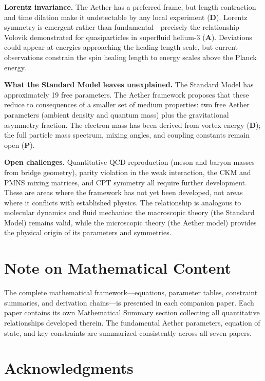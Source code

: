 \documentclass[12pt,letterpaper]{article}
\begin{document}
\textbf{Lorentz invariance.}
The Aether has a preferred frame, but length contraction and time dilation make it
undetectable by any local experiment (\textbf{D}).  Lorentz symmetry is emergent
rather than fundamental---precisely the relationship Volovik demonstrated for
quasiparticles in superfluid helium-3 (\textbf{A}).  Deviations could appear at
energies approaching the healing length scale, but current observations
constrain the spin healing length to energy scales above the Planck energy.

\textbf{What the Standard Model leaves unexplained.}
The Standard Model has approximately 19 free parameters.  The Aether framework
proposes that these reduce to consequences of a smaller set of medium properties:
two free Aether parameters (ambient density and quantum mass) plus the
gravitational asymmetry fraction.  The electron mass has been derived from
vortex energy (\textbf{D}); the full particle mass spectrum, mixing angles,
and coupling constants remain open (\textbf{P}).

\textbf{Open challenges.}
Quantitative QCD reproduction (meson and baryon masses from bridge geometry),
parity violation in the weak interaction, the CKM and PMNS mixing matrices,
and CPT symmetry all require further development.  These are areas where the
framework has not yet been developed, not areas where it conflicts with
established physics.  The relationship is analogous to molecular dynamics and
fluid mechanics: the macroscopic theory (the Standard Model) remains valid, while
the microscopic theory (the Aether model) provides the physical origin of its
parameters and symmetries.


\section*{Note on Mathematical Content}

The complete mathematical framework---equations, parameter tables, constraint
summaries, and derivation chains---is presented in each companion paper.
Each paper contains its own Mathematical Summary section collecting all
quantitative relationships developed therein.  The fundamental Aether parameters,
equation of state, and key constraints are summarized consistently across all
seven papers.


\section*{Acknowledgments}
\end{document}
